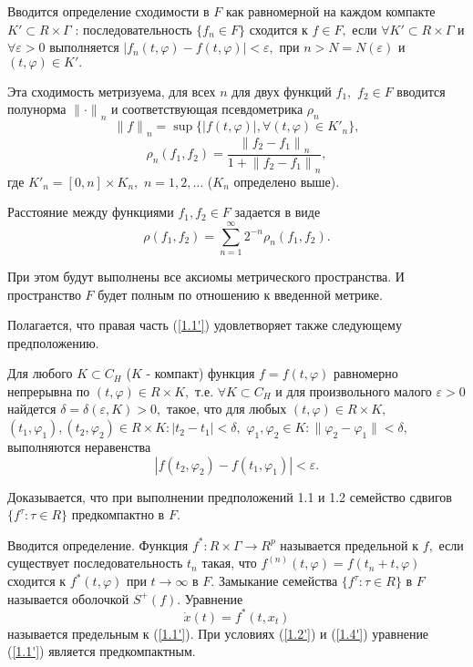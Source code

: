 	Вводится определение сходимости в $F$ как равномерной на каждом компакте
	$K'\subset R\times \Gamma $ : последовательность
	$\{f_n\in F\}$ сходится к $f\in F,$ если $\forall K'\subset
	R\times\Gamma $ и $\forall \varepsilon >0$ выполняется $|f_n(t,\varphi
	)-f(t,\varphi )|<\varepsilon,$ при $n>N=N(\varepsilon )$ и
	$(t,\varphi )\in K'.$
	
	Эта сходимость метризуема, для всех $n$ для двух функций $f_1,$
	$f_2\in F$ вводится полунорма ${\|\cdot \|}_n$ и соответствующая
	псевдометрика $\rho _n$  $${\| f\|
	}_n=\sup{\{|f(t,\varphi )|, \forall (t,\varphi )\in {K'}_n\} },$$
	$$\rho _n(f_1,f_2)=\frac{{\| f_2-f_1\| }_n}{1+{\| f_2-f_1\|
		}_n},$$ \noindent где ${K'}_n=[0,n]\times K_n,$ $n=1,2,\ldots $
	($K_n$ определено выше).
	
	Расстояние между функциями $f_1, f_2\in F$ задается в виде
	$$\rho (f_1,f_2)=\sum_{n=1}^{\infty }{2^{-n}\rho _n(f_1,f_2)}.
	\label{1.3'}$$
	
	При этом будут выполнены все аксиомы
	метрического пространства. И пространство
	$F$ будет полным по отношению к введенной метрике.
	
	Полагается,  что правая  часть   (\ref{1.1'})   удовлетворяет   также
	следующему предположению.
	
	Для любого $K\subset C_H$ ($K$ - компакт)
		функция $f=f(t,\varphi )$ равномерно непрерывна по
		$(t, \varphi )\in R\times K,$ т.е. $\forall K\subset C_H$ и для произвольного малого $\varepsilon
		>0$ найдется $\delta =\delta (\varepsilon ,K)>0,$ такое, что для
		любых $(t,\varphi)\in R\times K,$ $(t_1,\varphi _1),
		(t_2,\varphi _2)\in R\times K: |t_2-t_1|<\delta,$ $\varphi _1,
		\varphi _2\in K:\|\varphi _2-\varphi _1\|<\delta,$ выполняются
		неравенства
		\begin{equation}
		|f(t_2,\varphi _2)-f(t_1,\varphi
		_1)|<\varepsilon. \label{1.4'}
		\end{equation}
	
	Доказывается, что при выполнении предположений 1.1 и 1.2
		семейство сдвигов $\{f^{\tau }:\tau\in R\}$
		предкомпактно в $F.$
	
	Вводится определение. Функция $f^*:R\times\Gamma \to R^p$ называется предельной
		к $f,$ если существует  последовательность ${t_n}$
		такая,  что ${f^{(n)}(t,\varphi )=f(t_n+t,\varphi )}$ сходится к
		$f^*(t,\varphi )$ при $t \to \infty$ в $F.$ Замыкание семейства $\{f^{\tau }:\tau \in
		R\}$ в $F$ называется оболочкой $S^+(f).$ Уравнение
		\begin{equation}
		\dot x(t)=f^*(t,x_t) \label{1.5'}
		\end{equation}
		называется предельным к (\ref{1.1'}).
	При  условиях (\ref{1.2'}) и (\ref{1.4'})
	уравнение  (\ref{1.1'}) является предкомпактным. \cite{andr10}
	
